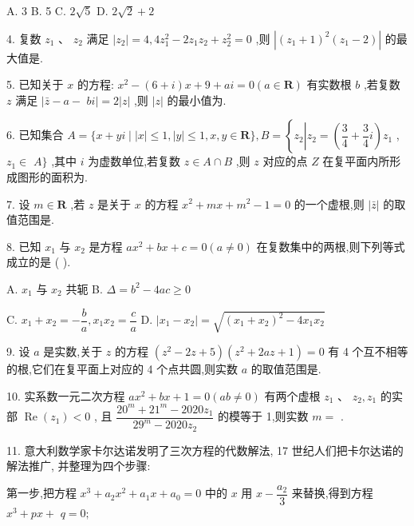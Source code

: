 A. 3 B. 5 C. $2\sqrt{5}$ D. $2\sqrt{2} + 2$

4. 复数 ${z}_{1}\text{ 、 }{z}_{2}$ 满足 $\left| {z}_{2}\right|  = 4,4{z}_{1}^{2} - 2{z}_{1}{z}_{2} + {z}_{2}^{2} = 0$ ,则 $\left| {{\left( {z}_{1} + 1\right) }^{2}\left( {{z}_{1} - 2}\right) }\right|$ 的最大值是\blkda{}.

5. 已知关于 $x$ 的方程: ${x}^{2} - \left( {6 + {i}}\right) x + 9 + a{i} = 0\left( {a \in  \mathbf{R}}\right)$ 有实数根 $b$ ,若复数 $z$ 满足 $\mid  \bar{z} - a -$  $b{i} \mid   = 2\left| z\right|$ ,则 $\left| z\right|$ 的最小值为\blkda{}.

6. 已知集合 $A = \{ x + y{i} \mid  \left| x\right|  \leq  1,\left| y\right|  \leq  1,x,y \in  \mathbf{R}\} ,B = \left\{  {{z}_{2}\left| {{z}_{2} = \left( {\dfrac{3}{4} + \dfrac{3}{4}{i}}\right) {z}_{1}}\right. }\right.$ , ${z}_{1} \in$  $A\}$ ,其中 ${i}$ 为虚数单位,若复数 $z \in  A \cap  B$ ,则 $z$ 对应的点 $Z$ 在复平面内所形成图形的面积为\blkda{}.

7. 设 $m \in  \mathbf{R}$ ,若 $z$ 是关于 $x$ 的方程 ${x}^{2} + {mx} + {m}^{2} - 1 = 0$ 的一个虚根,则 $\left| \bar{z}\right|$ 的取值范围是\blkda{}.

8. 已知 ${x}_{1}$ 与 ${x}_{2}$ 是方程 $a{x}^{2} + {bx} + c = 0\left( {a \neq  0}\right)$ 在复数集中的两根,则下列等式成立的是 (   ).

A. ${x}_{1}$ 与 ${x}_{2}$ 共轭 B. $\Delta  = {b}^{2} - {4ac} \geq  0$

C. ${x}_{1} + {x}_{2} =  - \dfrac{b}{a},{x}_{1}{x}_{2} = \dfrac{c}{a}$ D. $\left| {{x}_{1} - {x}_{2}}\right|  = \sqrt{{\left( {x}_{1} + {x}_{2}\right) }^{2} - 4{x}_{1}{x}_{2}}$

9. 设 $a$ 是实数,关于 $z$ 的方程 $\left( {{z}^{2} - {2z} + 5}\right) \left( {{z}^{2} + {2az} + 1}\right)  = 0$ 有 4 个互不相等的根,它们在复平面上对应的 4 个点共圆,则实数 $a$ 的取值范围是\blkda{}.

10. 实系数一元二次方程 $a{x}^{2} + {bx} + 1 = 0\left( {{ab} \neq  0}\right)$ 有两个虚根 ${z}_{1}\text{ 、 }{z}_{2},{z}_{1}$ 的实部 $\operatorname{Re}\left( {z}_{1}\right)  < 0$ , 且 $\dfrac{{20}^{m} + {21}^{m} - {2020}{z}_{1}}{{29}^{m} - {2020}{z}_{2}}$ 的模等于 1,则实数 $m =$ \blkda{}.

11. 意大利数学家卡尔达诺发明了三次方程的代数解法, 17 世纪人们把卡尔达诺的解法推广, 并整理为四个步骤:

第一步,把方程 ${x}^{3} + {a}_{2}{x}^{2} + {a}_{1}x + {a}_{0} = 0$ 中的 $x$ 用 $x - \dfrac{{a}_{2}}{3}$ 来替换,得到方程 ${x}^{3} + {px} +$  $q = 0;$

